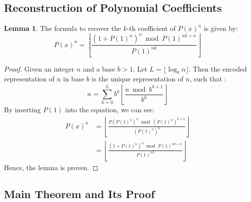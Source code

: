 \documentclass{article}
\theoremstyle{plain}
\theoremstyle{definition}
\newtheorem{lemma}{Lemma}
\begin{document}
\subsection{Reconstruction of Polynomial Coefficients}

\begin{lemma}
\label{lemma:1}
The formula to recover the $k$-th coefficient of $P(x)^{n}$ is given by:
\begin{equation}
[x^k] P(x)^{n} = \left\lfloor\frac{(1 + P(1)^{n})^{n} \bmod P(1)^{n k + n}}{P(1)^{n k}}\right\rfloor
\end{equation}
\end{lemma}

\begin{proof}
Given an integer $n$ and a base $b > 1$. Let $L = \lfloor \log_b{n} \rfloor$. Then the encoded representation of $n$ in base $b$ is the unique representation of $n$, such that \cite{cormen2009introduction}:
\begin{equation}
n = \sum_{k=0}^{L} b^{k} \left\lfloor\frac{n \bmod b^{k+1}}{b^{k}}\right\rfloor 
\end{equation}
By inserting $P(1)$ into the equation, we can see:
\begin{align}
    [x^k] P(x)^{n} &= \left\lfloor\frac{P(P(1)^{n})^{n} \bmod (P(1)^{n})^{k+1}}{(P(1)^{n})^{k}}\right\rfloor \\
    &= \left\lfloor\frac{(1 + P(1)^{n})^{n} \bmod P(1)^{n k + n}}{P(1)^{n k}}\right\rfloor
\end{align}
Hence, the lemma is proven.
\end{proof}

\subsection{Main Theorem and Its Proof}
\end{document}
